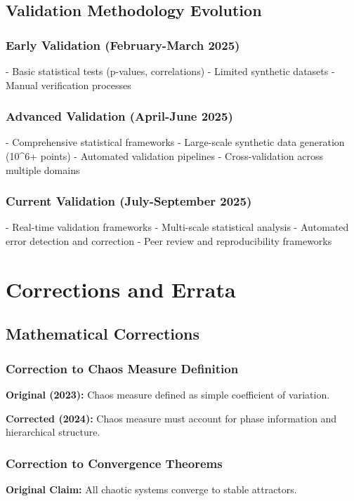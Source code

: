 \documentclass[12pt]{article}
\begin{document}
\subsection{Validation Methodology Evolution}

\subsubsection{Early Validation (February-March 2025)}
- Basic statistical tests (p-values, correlations)
- Limited synthetic datasets
- Manual verification processes

\subsubsection{Advanced Validation (April-June 2025)}
- Comprehensive statistical frameworks
- Large-scale synthetic data generation (10^6+ points)
- Automated validation pipelines
- Cross-validation across multiple domains

\subsubsection{Current Validation (July-September 2025)}
- Real-time validation frameworks
- Multi-scale statistical analysis
- Automated error detection and correction
- Peer review and reproducibility frameworks

\section{Corrections and Errata}

\subsection{Mathematical Corrections}

\subsubsection{Correction to Chaos Measure Definition}
\textbf{Original (2023):} Chaos measure defined as simple coefficient of variation.

\textbf{Corrected (2024):} Chaos measure must account for phase information and hierarchical structure.

\subsubsection{Correction to Convergence Theorems}
\textbf{Original Claim:} All chaotic systems converge to stable attractors.
\end{document}
